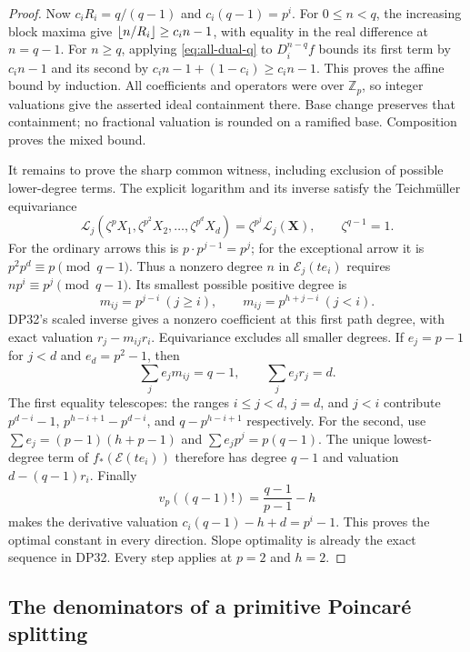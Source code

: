 \documentclass[11pt,a4paper]{article}
\theoremstyle{definition}\newtheorem{remark}[theorem]{Remark}
\newcommand{\Z}{\mathbb Z}\newcommand{\Q}{\mathbb Q}\newcommand{\F}{\mathbb F}
\begin{document}
\begin{proof}
Now $c_iR_i=q/(q-1)$ and $c_i(q-1)=p^i$. For $0\le n<q$, the increasing block maxima give $\left\lfloor n/R_i\right\rfloor\ge c_i n-1$, with equality in the real difference at $n=q-1$. For $n\ge q$, applying \eqref{eq:all-dual-q} to $D_i^{n-q}f$ bounds its first term by $c_i n-1$ and its second by $c_i n-1+(1-c_i)\ge c_i n-1$. This proves the affine bound by induction. All coefficients and operators were over $\Z_p$, so integer valuations give the asserted ideal containment there. Base change preserves that containment; no fractional valuation is rounded on a ramified base. Composition proves the mixed bound.

It remains to prove the sharp common witness, including exclusion of possible lower-degree terms. The explicit logarithm and its inverse satisfy the Teichm\"uller equivariance
\[
 \mathcal L_j(\zeta^pX_1,\zeta^{p^2}X_2,\ldots,\zeta^{p^d}X_d)
 =\zeta^{p^j}\mathcal L_j(\mathbf X),\qquad\zeta^{q-1}=1.
\]
For the ordinary arrows this is $p\cdot p^{j-1}=p^j$; for the exceptional arrow it is $p^2p^d\equiv p\pmod{q-1}$. Thus a nonzero degree $n$ in $\mathcal E_j(te_i)$ requires $np^i\equiv p^j\pmod{q-1}$. Its smallest possible positive degree is
\[
 m_{ij}=p^{j-i}\ (j\ge i),\qquad m_{ij}=p^{h+j-i}\ (j<i).
\]
DP32's scaled inverse gives a nonzero coefficient at this first path degree, with exact valuation $r_j-m_{ij}r_i$. Equivariance excludes all smaller degrees. If $e_j=p-1$ for $j<d$ and $e_d=p^2-1$, then
\[
 \sum_j e_jm_{ij}=q-1,\qquad \sum_j e_jr_j=d.
\]
The first equality telescopes: the ranges $i\le j<d$, $j=d$, and $j<i$ contribute $p^{d-i}-1$, $p^{h-i+1}-p^{d-i}$, and $q-p^{h-i+1}$ respectively. For the second, use $\sum e_j=(p-1)(h+p-1)$ and $\sum e_jp^j=p(q-1)$. The unique lowest-degree term of $f_*(\mathcal E(te_i))$ therefore has degree $q-1$ and valuation $d-(q-1)r_i$. Finally
\[
 v_p((q-1)!)=\frac{q-1}{p-1}-h
\]
makes the derivative valuation $c_i(q-1)-h+d=p^i-1$. This proves the optimal constant in every direction. Slope optimality is already the exact sequence in DP32. Every step applies at $p=2$ and $h=2$.
\end{proof}

\subsection{The denominators of a primitive Poincar\'e splitting}
\end{document}

